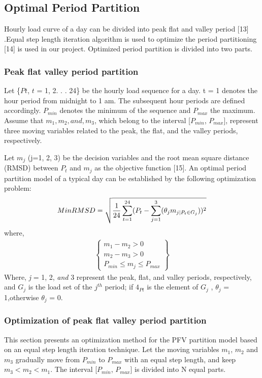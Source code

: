 \documentclass[14 pt]{article}
\begin{document}
\subsection{Optimal Period Partition}
Hourly load curve of a day can be divided into peak flat and valley period [13]
.Equal step length iteration algorithm is used to optimize the period partitioning
[14] is used in our project. Optimized period partition is divided into two parts.
\subsubsection{Peak flat valley period partition}
Let \{$Pt$, $t$ = 1, 2. . . 24\} be the hourly load sequence for a day. t = 1 denotes the
hour period from midnight to 1 am. The subsequent hour periods are defined accordingly. $P_{min}$ denotes the minimum of the sequence and $P_{max}$ the maximum.
Assume that $m_{1}, m_{2}, and, m_{3}$, which belong to the interval [$P_{min}$, $P_{max}$], represent three moving variables related to the peak, the flat, and the valley periods,
respectively.

Let $m_j$ (j=1, 2, 3) be the decision variables and the root mean square distance
(RMSD) between $P_t$ and $m_j$ as the objective function [15]. An optimal period
partition model of a typical day can be established by the following optimization
problem:
\begin{equation}
MinRMSD=\sqrt{\frac{1}{24}\sum_{t=1}^{24}(P_t-\sum_{j=1}^{3}(\theta_{j}m_{j|P_{t}\in G_{j}}))^2}\\
\end{equation}
where,
\begin{eqnarray}
\left\lbrace \begin{array}{cc}
 m_1-m_2 > 0\\
m_2 - m_3 > 0 \\
P_{min}\leq m_j \leq P_{max}
\end{array}\right\rbrace
\end{eqnarray}
Where, \textit{j} = 1, 2,\textit{ and} 3 represent the peak, flat, and valley periods, respectively, and $G_j$ is the load set of the $j^{th}$ period; if $4_{Pt}$ is the element of $G_{j}$ , $\theta_j$ = 1,otherwise $\theta_j$ = 0.
\subsubsection{Optimization of peak flat valley period partition
}   
This section presents an optimization method for the PFV partition model based
on an equal step length iteration technique. Let the moving variables $m_1$, $m_2$
and $m_3$ gradually move from $P_{min}$ to $P_{max}$ with an equal step length, and keep
$m_3 < m_2 < m_1$. The interval [$P_{min}$, $P_{max}$] is divided into N equal parts.\\
\end{document}
